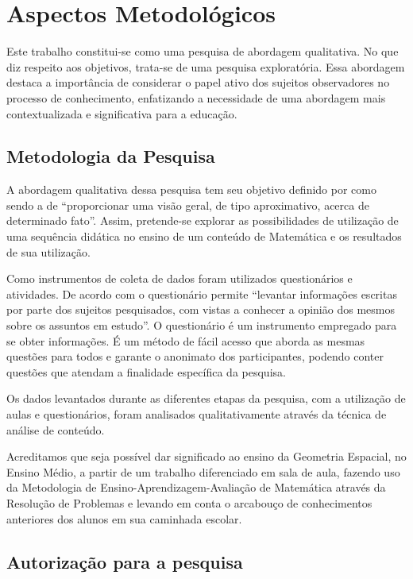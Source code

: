 \chapter{Aspectos Metodológicos} \label{cap:3_aspectos}

Este trabalho constitui-se como uma pesquisa de abordagem qualitativa. No que diz respeito aos objetivos, trata-se de uma pesquisa exploratória. Essa abordagem destaca a importância de considerar o papel ativo dos sujeitos observadores no processo de conhecimento, enfatizando a necessidade de uma abordagem mais contextualizada e significativa para a educação.

\section{Metodologia da Pesquisa}

A abordagem qualitativa dessa pesquisa tem seu objetivo definido por  como sendo a de ``proporcionar uma visão geral, de tipo aproximativo, acerca de determinado fato''. Assim, pretende-se explorar as possibilidades de utilização de uma sequência didática no ensino de um conteúdo de Matemática e os resultados de sua utilização.

Como instrumentos de coleta de dados foram utilizados questionários e atividades. De acordo com  o questionário permite ``levantar informações escritas por parte dos sujeitos pesquisados, com vistas a conhecer a opinião dos mesmos sobre os assuntos em estudo''. O questionário é um instrumento empregado para se obter informações. É um método de fácil acesso que aborda as mesmas questões para todos e garante o anonimato dos participantes, podendo conter questões que atendam a finalidade específica da pesquisa.

Os dados levantados durante as diferentes etapas da pesquisa, com a utilização de aulas e questionários, foram analisados qualitativamente através da técnica de análise de conteúdo.

Acreditamos que seja possível dar significado ao ensino da Geometria Espacial, no Ensino Médio, a partir de um trabalho diferenciado em sala de aula, fazendo uso da Metodologia de Ensino-Aprendizagem-Avaliação de Matemática através da Resolução de Problemas e levando em conta o arcabouço de  conhecimentos anteriores dos alunos em sua caminhada escolar.

\section{Autorização para a pesquisa}

